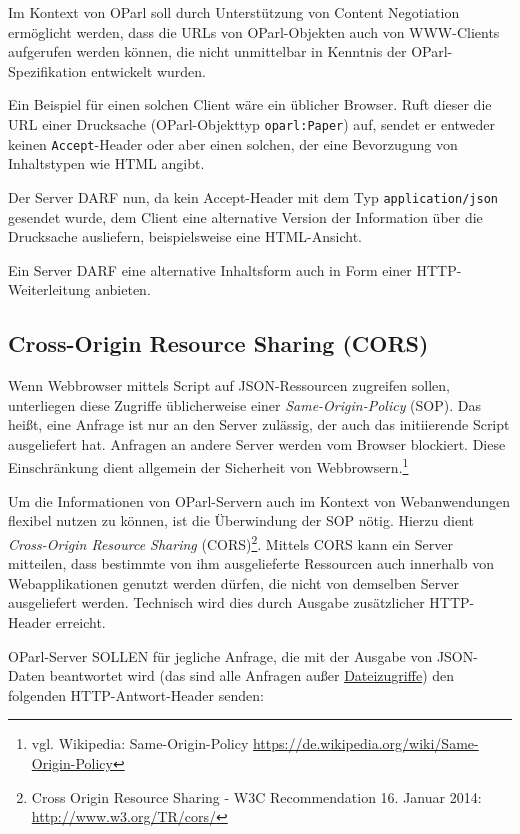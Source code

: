 \documentclass[,a4paper]{article}
\begin{document}
Im Kontext von OParl soll durch Unterstützung von Content Negotiation
ermöglicht werden, dass die URLs von OParl-Objekten auch von WWW-Clients
aufgerufen werden können, die nicht unmittelbar in Kenntnis der
OParl-Spezifikation entwickelt wurden.

Ein Beispiel für einen solchen Client wäre ein üblicher Browser. Ruft
dieser die URL einer Drucksache (OParl-Objekttyp \texttt{oparl:Paper})
auf, sendet er entweder keinen \texttt{Accept}-Header oder aber einen
solchen, der eine Bevorzugung von Inhaltstypen wie HTML angibt.

Der Server DARF nun, da kein Accept-Header mit dem Typ
\texttt{application/json} gesendet wurde, dem Client eine alternative
Version der Information über die Drucksache ausliefern, beispielsweise
eine HTML-Ansicht.

Ein Server DARF eine alternative Inhaltsform auch in Form einer
HTTP-Weiterleitung anbieten.

\subsection{Cross-Origin Resource Sharing (CORS)}\label{cors}

Wenn Webbrowser mittels Script auf JSON-Ressourcen zugreifen sollen,
unterliegen diese Zugriffe üblicherweise einer \emph{Same-Origin-Policy}
(SOP). Das heißt, eine Anfrage ist nur an den Server zulässig, der auch
das initiierende Script ausgeliefert hat. Anfragen an andere Server
werden vom Browser blockiert. Diese Einschränkung dient allgemein der
Sicherheit von Webbrowsern.\footnote{vgl. Wikipedia: Same-Origin-Policy
  \url{https://de.wikipedia.org/wiki/Same-Origin-Policy}}

Um die Informationen von OParl-Servern auch im Kontext von
Webanwendungen flexibel nutzen zu können, ist die Überwindung der SOP
nötig. Hierzu dient \emph{Cross-Origin Resource Sharing}
(CORS)\footnote{Cross Origin Resource Sharing - W3C Recommendation 16.
  Januar 2014: \url{http://www.w3.org/TR/cors/}}. Mittels CORS kann ein
Server mitteilen, dass bestimmte von ihm ausgelieferte Ressourcen auch
innerhalb von Webapplikationen genutzt werden dürfen, die nicht von
demselben Server ausgeliefert werden. Technisch wird dies durch Ausgabe
zusätzlicher HTTP-Header erreicht.

OParl-Server SOLLEN für jegliche Anfrage, die mit der Ausgabe von
JSON-Daten beantwortet wird (das sind alle Anfragen außer
\hyperref[dateizugriff]{Dateizugriffe}) den folgenden
HTTP-Antwort-Header senden:
\end{document}
